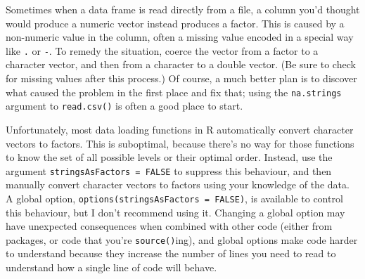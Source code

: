 Sometimes when a data frame is read directly from a file, a column you'd
thought would produce a numeric vector instead produces a factor. This
is caused by a non-numeric value in the column, often a missing value
encoded in a special way like \texttt{.} or \texttt{-}. To remedy the
situation, coerce the vector from a factor to a character vector, and
then from a character to a double vector. (Be sure to check for missing
values after this process.) Of course, a much better plan is to discover
what caused the problem in the first place and fix that; using the
\texttt{na.strings} argument to \texttt{read.csv()} is often a good
place to start.

\begin{Shaded}
\begin{Highlighting}[]
\StringTok{ }\NormalTok{(} \NormalTok{)}
\NormalTok{(}
\StringTok{ }\NormalTok{(} \NormalTok{, }\NormalTok{)}
\end{Highlighting}
\end{Shaded}

Unfortunately, most data loading functions in R automatically convert
character vectors to factors. This is suboptimal, because there's no way
for those functions to know the set of all possible levels or their
optimal order. Instead, use the argument
\texttt{stringsAsFactors = FALSE} to suppress this behaviour, and then
manually convert character vectors to factors using your knowledge of
the data. A global option, \texttt{options(stringsAsFactors = FALSE)},
is available to control this behaviour, but I don't recommend using it.
Changing a global option may have unexpected consequences when combined
with other code (either from packages, or code that you're
\texttt{source()}ing), and global options make code harder to understand
because they increase the number of lines you need to read to understand
how a single line of code will behave. 

